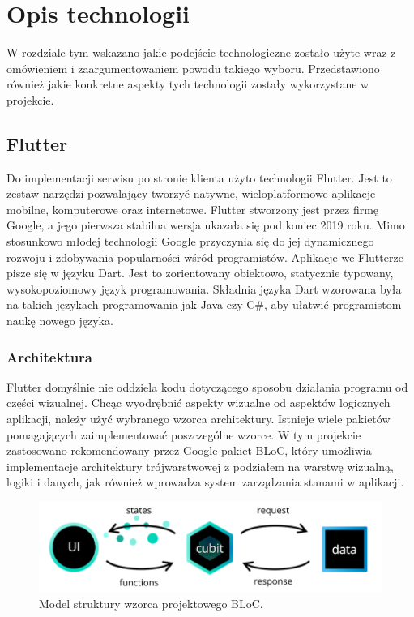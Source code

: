 \chapter{Opis technologii}
\thispagestyle{chapterBeginStyle}

W rozdziale tym wskazano jakie podejście technologiczne zostało użyte wraz z omówieniem i zaargumentowaniem powodu takiego wyboru. Przedstawiono również jakie konkretne aspekty tych technologii zostały wykorzystane w projekcie.

\section{Flutter}

Do implementacji serwisu po stronie klienta użyto technologii Flutter. Jest to zestaw narzędzi pozwalający tworzyć natywne, wieloplatformowe aplikacje mobilne, komputerowe oraz internetowe. Flutter stworzony jest przez firmę Google, a jego pierwsza stabilna wersja ukazała się pod koniec 2019 roku. Mimo stosunkowo młodej technologii Google przyczynia się do jej dynamicznego rozwoju i zdobywania popularności wśród programistów. Aplikacje we Flutterze pisze się w języku Dart. Jest to zorientowany obiektowo, statycznie typowany, wysokopoziomowy język programowania.
Składnia języka Dart wzorowana była na takich językach programowania jak Java czy C\#, aby ułatwić programistom naukę nowego języka.

\subsection{Architektura}

Flutter domyślnie nie oddziela kodu dotyczącego sposobu działania programu od części wizualnej. Chcąc wyodrębnić aspekty wizualne od aspektów logicznych aplikacji, należy użyć wybranego wzorca architektury. Istnieje wiele pakietów pomagających zaimplementować poszczególne wzorce. W tym projekcie zastosowano rekomendowany przez Google pakiet BLoC, który umożliwia implementacje architektury trójwarstwowej z podziałem na warstwę wizualną, logiki i danych, jak również wprowadza system zarządzania stanami w aplikacji.

\begin{figure}[h!]
	\begin{center}
		\includegraphics[width=1\textwidth]{img/cubit.png}
	\end{center}
	\caption{{\color{dgray}Model struktury wzorca projektowego BLoC.}} 
	\label{struktura_BLoC}
\end{figure}  

